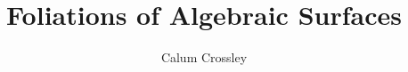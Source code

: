 \documentclass{article}
\title{Foliations of Algebraic Surfaces}
\author{Calum Crossley}
\date{}
\begin{document}
\maketitle

\newpage

\tableofcontents

\newpage



\sloppy
\printbibliography
\end{document}
